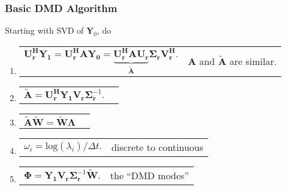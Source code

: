 \documentclass[fleqn]{beamer}
\renewcommand{\vec}[1]{\bm{#1}} %
\begin{document}
\begin{frame}
\frametitle{Basic DMD Algorithm}

Starting with SVD of $\mathbf{Y}_0$, do
\begin{enumerate}
 \pause
 \item 
 \begin{tabular}{p{6cm}r}
  $\mathbf{U_r^{H}Y_1} = \mathbf{U_r^H}\mathbf{A}\mathbf{Y_0} =  \underbrace{\mathbf{U_r^{H} A U_r}}_{\tilde{\mathbf{A}}}\boldsymbol{\Sigma}\mathbf{_r}\mathbf{V_r^{H}}.$
    &  \pause $\mathbf{A}$ and $\mathbf{\tilde{A}}$ are similar. \\
 \end{tabular}
 \pause
 \item 
 \begin{tabular}{p{5cm}r}
  $\mathbf{\tilde{A}}=\mathbf{U_r^{H}Y_1}\mathbf{V_r}\boldsymbol{\Sigma}_{\mathbf{r}}^{-1}.$
    &   \\
 \end{tabular}
 \pause
 \item 
 \begin{tabular}{p{5cm}r}
   $\mathbf{\tilde{A} \tilde{W}}=\mathbf{\tilde{W}}\boldsymbol{\Lambda}$ 
    &    \\
 \end{tabular}
 \pause
 \item 
 \begin{tabular}{p{5cm}r}
    $\omega_i= \text{log}(\lambda_i)/\Delta t.$
    &  \pause discrete to continuous \\
 \end{tabular}
 \pause
 \item 
 \begin{tabular}{p{5cm}r}
   ${\boldsymbol{\Phi}}={\mathbf{Y_1 V_r}}\boldsymbol{\Sigma}_\mathbf{r}^{-1}{\mathbf{\tilde{W}}}.$
    &  \pause the ``DMD modes'' \\
 \end{tabular}
\end{enumerate}


\end{frame}
\end{document}
